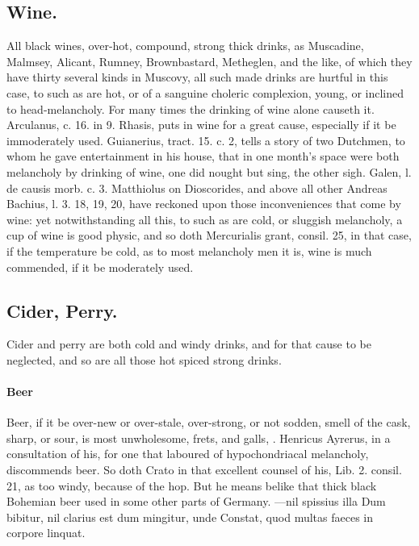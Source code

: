 {{\subsection{Wine.}
All black wines, over-hot, compound, strong thick drinks, as
Muscadine, Malmsey, Alicant, Rumney, Brownbastard, Metheglen, and the
like, of which they have thirty several kinds in Muscovy, all such made
drinks are hurtful in this case, to such as are hot, or of a sanguine
choleric complexion, young, or inclined to head-melancholy. For many
times the drinking of wine alone causeth it. Arculanus, c. 16. in 9.
Rhasis, puts in wine for a great cause, especially if it be
immoderately used. Guianerius, tract. 15. c. 2, tells a story of two
Dutchmen, to whom he gave entertainment in his house, that in one
month's space were both melancholy by drinking of wine, one did nought
but sing, the other sigh. Galen, l. de causis morb. c. 3. Matthiolus on
Dioscorides, and above all other Andreas Bachius, l. 3. 18, 19, 20,
have reckoned upon those inconveniences that come by wine: yet
notwithstanding all this, to such as are cold, or sluggish melancholy,
a cup of wine is good physic, and so doth Mercurialis grant, consil.
25, in that case, if the temperature be cold, as to most melancholy men
it is, wine is much commended, if it be moderately used.
\subsection{Cider, Perry.}

Cider and perry are both cold and windy drinks, and
for that cause to be neglected, and so are all those hot spiced strong
drinks.

\paragraph{Beer} Beer, if it be over-new or over-stale, over-strong, or not
sodden, smell of the cask, sharp, or sour, is most unwholesome, frets,
and galls, \etc{}. Henricus Ayrerus, in a consultation of his, for
one that laboured of hypochondriacal melancholy, discommends beer. So
doth  Crato in that excellent counsel of his, Lib. 2. consil. 21,
as too windy, because of the hop. But he means belike that thick black
Bohemian beer used in some other parts of Germany.
---nil spissius illa
Dum bibitur, nil clarius est dum mingitur, unde
Constat, quod multas faeces in corpore linquat.

}}
